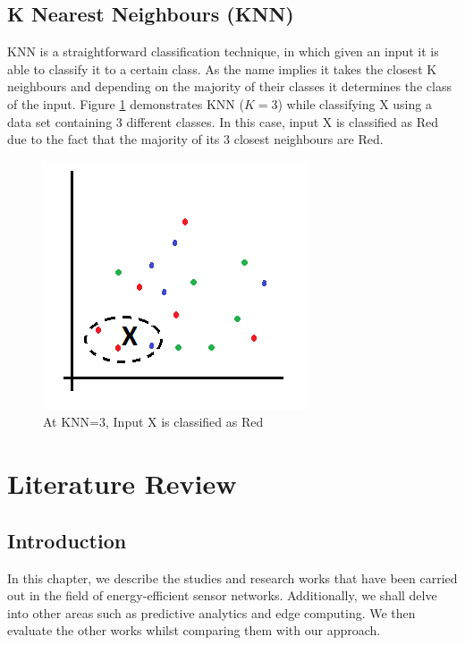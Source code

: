 \documentclass{mproj}
\begin{document}
\section{K Nearest Neighbours (KNN)}
\label{sec:knnExplanation}
KNN \cite{knn} is a straightforward classification technique, in which given an input it is able to classify it to a certain class. As the name implies it takes the closest K neighbours and depending on the majority of their classes it determines the class of the input. Figure \ref{fig:knn} demonstrates KNN ($K=3$) while classifying X using a data set containing 3 different classes. In this case, input X is classified as Red due to the fact that the majority of its 3 closest neighbours are Red.
\begin{figure}[H]
\caption{At KNN=3, Input X is classified as Red}
\label{fig:knn}
\centerline{\includegraphics[scale=1]{knn}}
\end{figure}

\chapter{Literature Review}
\section{Introduction}
In this chapter, we describe the studies and research works that have been carried out in the field of energy-efficient sensor networks. Additionally, we shall delve into other areas such as predictive analytics and edge computing. We then evaluate the other works whilst comparing them with our approach.
\end{document}
